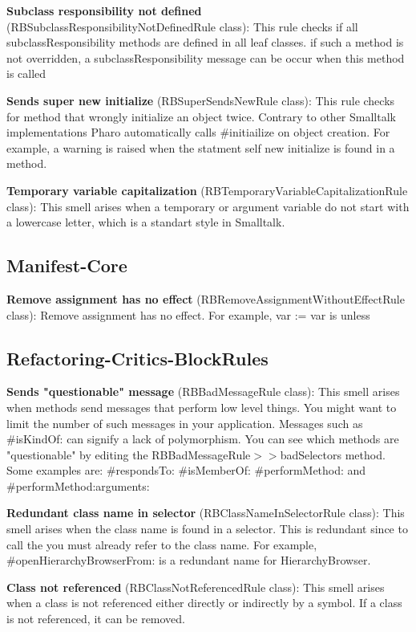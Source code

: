 \textbf{Subclass responsibility not defined} (RBSubclassResponsibilityNotDefinedRule class): This rule checks if all subclassResponsibility methods are defined in all leaf classes. if such a method is not overridden, a subclassResponsibility message can be occur when this method is called

\textbf{Sends super new initialize} (RBSuperSendsNewRule class):  This rule checks for method that wrongly initialize an object twice. Contrary to other Smalltalk implementations Pharo automatically calls \#initiailize on object creation.
For example, a warning is raised when the statment self new initialize is found in a method.

\textbf{Temporary variable capitalization} (RBTemporaryVariableCapitalizationRule class): This smell arises when a temporary or argument variable do not start with a lowercase letter, which is a standart style in Smalltalk.

\subsection{Manifest-Core}
\textbf{Remove assignment has no effect} (RBRemoveAssignmentWithoutEffectRule class): Remove assignment has no effect. For example, var := var is unless

\subsection{Refactoring-Critics-BlockRules}
\textbf{Sends "questionable" message} (RBBadMessageRule class): This smell arises when methods send messages that perform low level things. You might want to limit the number of such messages in your application. Messages such as \#isKindOf: can signify a lack of polymorphism. You can see which methods are "questionable" by editing the RBBadMessageRule$>>$badSelectors method. Some examples are: \#respondsTo: \#isMemberOf: \#performMethod: and \#performMethod:arguments:

\textbf{Redundant class name in selector} (RBClassNameInSelectorRule class): This smell arises when the class name is found in a selector. This is redundant since to call the you must already refer to the class name. For example, \#openHierarchyBrowserFrom: is a redundant name for HierarchyBrowser.

\textbf{Class not referenced} (RBClassNotReferencedRule class): This smell arises when a class is not referenced either directly or indirectly by a symbol. If a class is not referenced, it can be removed.

